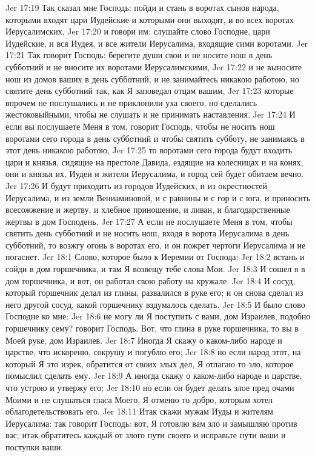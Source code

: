 Jer 17:19  Так сказал мне Господь: пойди и стань в воротах сынов народа, которыми входят цари Иудейские и которыми они выходят, и во всех воротах Иерусалимских,
Jer 17:20  и говори им: слушайте слово Господне, цари Иудейские, и вся Иудея, и все жители Иерусалима, входящие сими воротами.
Jer 17:21  Так говорит Господь: берегите души свои и не носите нош в день субботний и не вносите их воротами Иерусалимскими,
Jer 17:22  и не выносите нош из домов ваших в день субботний, и не занимайтесь никакою работою, но святите день субботний так, как Я заповедал отцам вашим,
Jer 17:23  которые впрочем не послушались и не приклонили уха своего, но сделались жестоковыйными, чтобы не слушать и не принимать наставления.
Jer 17:24  И если вы послушаете Меня в том, говорит Господь, чтобы не носить нош воротами сего города в день субботний и чтобы святить субботу, не занимаясь в этот день никакою работою,
Jer 17:25  то воротами сего города будут входить цари и князья, сидящие на престоле Давида, ездящие на колесницах и на конях, они и князья их, Иудеи и жители Иерусалима, и город сей будет обитаем вечно.
Jer 17:26  И будут приходить из городов Иудейских, и из окрестностей Иерусалима, и из земли Вениаминовой, и с равнины и с гор и с юга, и приносить всесожжение и жертву, и хлебное приношение, и ливан, и благодарственные жертвы в дом Господень.
Jer 17:27  А если не послушаете Меня в том, чтобы святить день субботний и не носить нош, входя в ворота Иерусалима в день субботний, то возжгу огонь в воротах его, и он пожрет чертоги Иерусалима и не погаснет.
Jer 18:1  Слово, которое было к Иеремии от Господа:
Jer 18:2  встань и сойди в дом горшечника, и там Я возвещу тебе слова Мои.
Jer 18:3  И сошел я в дом горшечника, и вот, он работал свою работу на кружале.
Jer 18:4  И сосуд, который горшечник делал из глины, развалился в руке его; и он снова сделал из него другой сосуд, какой горшечнику вздумалось сделать.
Jer 18:5  И было слово Господне ко мне:
Jer 18:6  не могу ли Я поступить с вами, дом Израилев, подобно горшечнику сему? говорит Господь. Вот, что глина в руке горшечника, то вы в Моей руке, дом Израилев.
Jer 18:7  Иногда Я скажу о каком-либо народе и царстве, что искореню, сокрушу и погублю его;
Jer 18:8  но если народ этот, на который Я это изрек, обратится от своих злых дел, Я отлагаю то зло, которое помыслил сделать ему.
Jer 18:9  А иногда скажу о каком-либо народе и царстве, что устрою и утвержу его;
Jer 18:10  но если он будет делать злое пред очами Моими и не слушаться гласа Моего, Я отменю то добро, которым хотел облагодетельствовать его.
Jer 18:11  Итак скажи мужам Иуды и жителям Иерусалима: так говорит Господь: вот, Я готовлю вам зло и замышляю против вас; итак обратитесь каждый от злого пути своего и исправьте пути ваши и поступки ваши.
